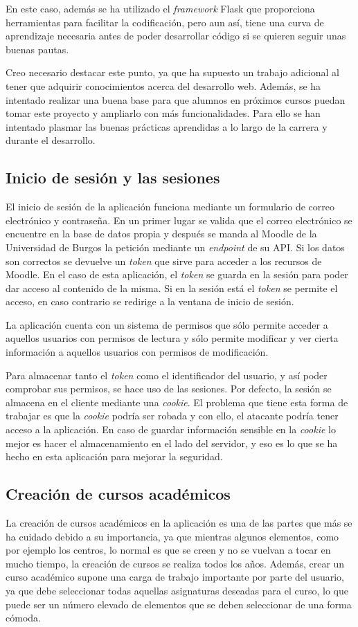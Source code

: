 En este caso, además se ha utilizado el \textit{framework} Flask que proporciona herramientas para facilitar la codificación, pero aun así, tiene una curva de aprendizaje necesaria antes de poder desarrollar código si se quieren seguir unas buenas pautas.

Creo necesario destacar este punto, ya que ha supuesto un trabajo adicional al tener que adquirir conocimientos acerca del desarrollo web.
Además, se ha intentado realizar una buena base para que alumnos en próximos cursos puedan tomar este proyecto y ampliarlo con más funcionalidades.
Para ello se han intentado plasmar las buenas prácticas aprendidas a lo largo de la carrera y durante el desarrollo.

\subsection{Inicio de sesión y las sesiones}
El inicio de sesión de la aplicación funciona mediante un formulario de correo electrónico y contraseña.
En un primer lugar se valida que el correo electrónico se encuentre en la base de datos propia y después se manda al Moodle de la Universidad de Burgos la petición mediante un \textit{endpoint} de su API. 
Si los datos son correctos se devuelve un \textit{token} que sirve para acceder a los recursos de Moodle.
En el caso de esta aplicación, el \textit{token} se guarda en la sesión para poder dar acceso al contenido de la misma.
Si en la sesión está el \textit{token} se permite el acceso, en caso contrario se redirige a la ventana de inicio de sesión.

La aplicación cuenta con un sistema de permisos que sólo permite acceder a aquellos usuarios con permisos de lectura y sólo permite modificar y ver cierta información a aquellos usuarios con permisos de modificación.

Para almacenar tanto el \textit{token} como el identificador del usuario, y así poder comprobar sus permisos, se hace uso de las sesiones.
Por defecto, la sesión se almacena en el cliente mediante una \textit{cookie}. 
El problema que tiene esta forma de trabajar es que la \textit{cookie} podría ser robada y con ello, el atacante podría tener acceso a la aplicación. 
En caso de guardar información sensible en la \textit{cookie} lo mejor es hacer el almacenamiento en el lado del servidor, y eso es lo que se ha hecho en esta aplicación para mejorar la seguridad.

\subsection{Creación de cursos académicos}
La creación de cursos académicos en la aplicación es una de las partes que más se ha cuidado debido a su importancia, ya que mientras algunos elementos, como por ejemplo los centros, lo normal es que se creen y no se vuelvan a tocar en mucho tiempo, la creación de cursos se realiza todos los años.
Además, crear un curso académico supone una carga de trabajo importante por parte del usuario, ya que debe seleccionar todas aquellas asignaturas deseadas para el curso, lo que puede ser un número elevado de elementos que se deben seleccionar de una forma cómoda.

